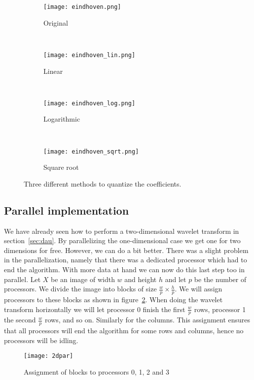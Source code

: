 \begin{figure}
	\begin{subfigure}[b]{0.25\textwidth}
		\centering
		\texttt{[image: eindhoven.png]}
		\caption{Original}
	\end{subfigure}~
	\begin{subfigure}[b]{0.25\textwidth}
		\centering
		\texttt{[image: eindhoven\_lin.png]}
		\caption{Linear}
	\end{subfigure}~
	\begin{subfigure}[b]{0.25\textwidth}
		\centering
		\texttt{[image: eindhoven\_log.png]}
		\caption{Logarithmic}
	\end{subfigure}~
	\begin{subfigure}[b]{0.25\textwidth}
		\centering
		\texttt{[image: eindhoven\_sqrt.png]}
		\caption{Square root}
	\end{subfigure}
	\caption{Three different methods to quantize the coefficients.}
	\label{fig:quantization}
\end{figure}


\subsection{Parallel implementation}
We have already seen how to perform a two-dimensional wavelet transform in section~\ref{sec:dau}. By parallelizing the one-dimensional case we get one for two dimensions for free. However, we can do a bit better. There was a slight problem in the parallelization, namely that there was a dedicated processor which had to end the algorithm. With more data at hand we can now do this last step too in parallel. Let $X$ be an image of width $w$ and height $h$ and let $p$ be the number of processors. We divide the image into blocks of size $\frac{w}{p}\times\frac{h}{p}$. We will assign processors to these blocks as shown in figure~\ref{fig:par2d}. When doing the wavelet transform horizontally we will let processor 0 finish the first $\frac{w}{p}$ rows, processor 1 the second $\frac{w}{p}$ rows, and so on. Similarly for the columns. This assignment ensures that all processors will end the algorithm for some rows and columns, hence no processors will be idling.

\begin{figure}
	\centering
	\texttt{[image: 2dpar]}
	\caption{Assignment of blocks to processors 0, 1, 2 and 3}
	\label{fig:par2d}
\end{figure}

